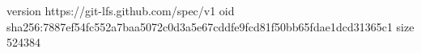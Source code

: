 version https://git-lfs.github.com/spec/v1
oid sha256:7887ef54fc552a7baa5072c0d3a5e67cddfe9fcd81f50bb65fdae1dcd31365c1
size 524384
